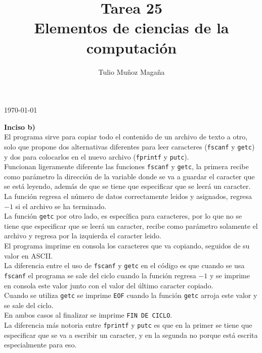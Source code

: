 \documentclass[12pt]{article}
\begin{document}
\title{Tarea 25\\
	\large Elementos de ciencias de la computación}

\author{Tulio Muñoz Magaña}
\today
\maketitle

\textbf{Inciso b)}\\

El programa sirve para copiar todo el contenido de un archivo de texto a otro, solo que propone dos alternativas diferentes para leer caracteres (\texttt{fscanf} y \texttt{getc}) y dos para colocarlos en el nuevo archivo (\texttt{fprintf} y \texttt{putc}).\\

Funcionan ligeramente diferente las funciones \texttt{fscanf} y \texttt{getc}, la primera recibe como parámetro la dirección de la variable donde se va a guardar el caracter que se está leyendo, además de que se tiene que especificar que se leerá un caracter. La función regresa el número de datos correctamente leidos y asignados, regresa $-1$ si el archivo se ha terminado.\\
La función \texttt{getc} por otro lado, es específica para caracteres, por lo que no se tiene que especificar que se leerá un caracter, recibe como parámetro solamente el archivo y regresa por la izquierda el caracter leido.\\

El programa imprime en consola los caracteres que va copiando, seguidos de su valor en ASCII. \\
La diferencia entre el uso de \texttt{fscanf} y \texttt{getc} en el código es que cuando se usa \texttt{fscanf} el programa se sale del ciclo cuando la función regresa $-1$ y se imprime en consola este valor junto con el valor del último caracter copiado.\\
Cuando se utiliza \texttt{getc} se imprime \texttt{EOF} cuando la función \texttt{getc} arroja este valor y se sale del ciclo.\\

En ambos casos al finalizar se imprime \texttt{FIN DE CICLO}.\\

La diferencia más notoria entre \texttt{fprintf} y \texttt{putc} es que en la primer se tiene que especificar que se va a escribir un caracter, y en la segunda no porque está escrita especialmente para eso.\\
\end{document}
